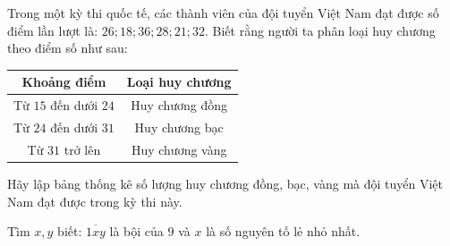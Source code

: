 \begin{bt}%
	Trong một kỳ thi quốc tế, các thành viên của đội tuyển Việt Nam đạt được số điểm lần lượt là:
	$26;  18; 36;  28;  21; 32.$
	Biết rằng người ta phân loại huy chương theo điểm số như sau:
	 \begin{center}
	\begin{tabular}{|c|c|}
		\hline
		\textbf{Khoảng điểm} & \textbf{Loại huy chương} \\ \hline
		Từ $15$ đến dưới $24$ & Huy chương đồng \\ \hline
		Từ $24$ đến dưới $31$ & Huy chương bạc \\ \hline
		Từ $31$ trở lên & Huy chương vàng \\ \hline
	\end{tabular}
	\end{center}
	Hãy lập bảng thống kê số lượng huy chương đồng, bạc, vàng mà đội tuyển Việt Nam đạt được trong kỳ thi này.
\end{bt}


\begin{bt} 
	Tìm $x, y$ biết: $\overline{1xy}$ là bội của $9$ và $x$ là số nguyên tố lẻ nhỏ nhất.
\end{bt}